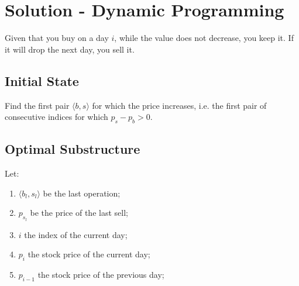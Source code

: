 \documentclass{article}
\newcommand{\R}{\mathbb{R}}
\theoremstyle{definition}
\theoremstyle{plain}
\begin{document}





\section{Solution - Dynamic Programming}

Given that you buy on a day $i$, while the value does not decrease, you keep it. If it will drop the next day, you sell it.

\subsection{Initial State}

Find the first pair $\langle b, s \rangle$ for which the price increases, i.e. the first pair of consecutive indices for which $p_s - p_b > 0$.

\subsection{Optimal Substructure}

Let:

\begin{enumerate}
    \item $\langle b_l, s_l \rangle$ be the last operation;
    \item $p_{s_l}$ be the price of the last sell;
    \item $i$ the index of the current day;
    \item $p_i$ the stock price of the current day;
    \item $p_{i-1}$ the stock price of the previous day;
\end{enumerate}
\end{document}

